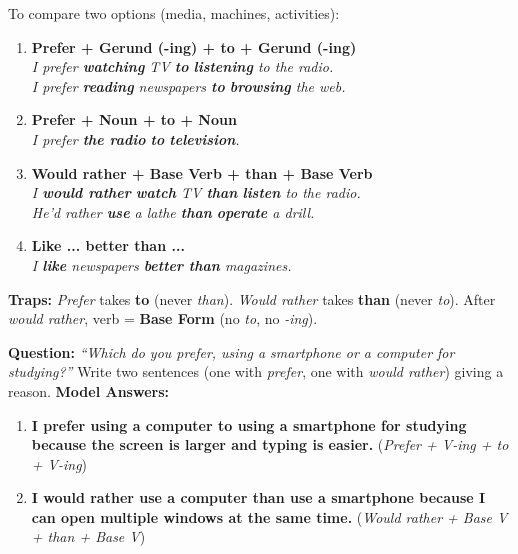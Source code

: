 \documentclass[11pt]{article}
\begin{document}
\begin{methode}
To compare two options (media, machines, activities):
\begin{enumerate}
\item \textbf{Prefer + Gerund (-ing) + to + Gerund (-ing)} \\
\emph{I prefer \textbf{watching} TV \textbf{to} \textbf{listening} to the radio.} \\
\emph{I prefer \textbf{reading} newspapers \textbf{to} \textbf{browsing} the web.}
\item \textbf{Prefer + Noun + to + Noun} \\
\emph{I prefer \textbf{the radio} \textbf{to} \textbf{television}.}
\item \textbf{Would rather + Base Verb + than + Base Verb} \\
\emph{I \textbf{would rather} \textbf{watch} TV \textbf{than} \textbf{listen} to the radio.} \\
\emph{He'd rather \textbf{use} a lathe \textbf{than} \textbf{operate} a drill.}
\item \textbf{Like ... better than ...} \\
\emph{I \textbf{like} newspapers \textbf{better than} magazines.}
\end{enumerate}
\textbf{Traps:} \emph{Prefer} takes \textbf{to} (never \emph{than}). \emph{Would rather} takes \textbf{than} (never \emph{to}). After \emph{would rather}, verb = \textbf{Base Form} (no \emph{to}, no \emph{-ing}).
\end{methode}

\begin{exoresolu}
\textbf{Question:} \emph{``Which do you prefer, using a smartphone or a computer for studying?''} Write two sentences (one with \emph{prefer}, one with \emph{would rather}) giving a reason.
\tcblower
\textbf{Model Answers:}
\begin{enumerate}
\item \textbf{I prefer using a computer to using a smartphone for studying because the screen is larger and typing is easier.} (\emph{Prefer + V-ing + to + V-ing})
\item \textbf{I would rather use a computer than use a smartphone because I can open multiple windows at the same time.} (\emph{Would rather + Base V + than + Base V})
\end{enumerate}
\end{exoresolu}
\end{document}
